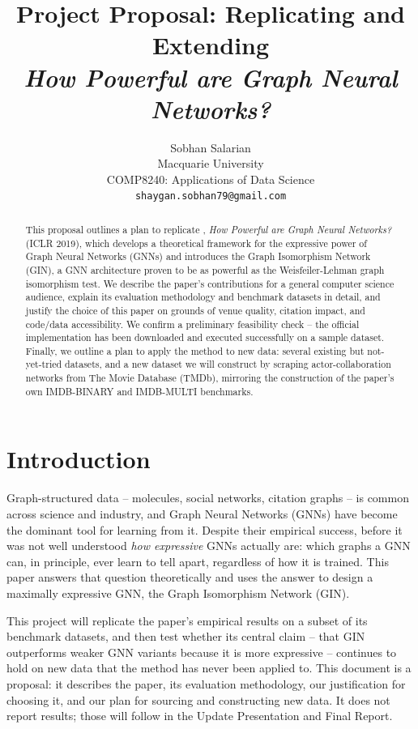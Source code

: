 \documentclass[11pt]{article}
\title{Project Proposal: Replicating and Extending \\ \textit{How Powerful are Graph Neural Networks?}}
\author{
  Sobhan Salarian \\
  Macquarie University \\
  COMP8240: Applications of Data Science \\
  \texttt{shaygan.sobhan79@gmail.com}
}
\begin{document}
\raggedbottom
\maketitle

\begin{abstract}
This proposal outlines a plan to replicate \citet{xu2019gin}, \textit{How Powerful are Graph Neural Networks?} (ICLR 2019), which develops a theoretical framework for the expressive power of Graph Neural Networks (GNNs) and introduces the Graph Isomorphism Network (GIN), a GNN architecture proven to be as powerful as the Weisfeiler-Lehman graph isomorphism test. We describe the paper's contributions for a general computer science audience, explain its evaluation methodology and benchmark datasets in detail, and justify the choice of this paper on grounds of venue quality, citation impact, and code/data accessibility. We confirm a preliminary feasibility check -- the official implementation has been downloaded and executed successfully on a sample dataset. Finally, we outline a plan to apply the method to new data: several existing but not-yet-tried datasets, and a new dataset we will construct by scraping actor-collaboration networks from The Movie Database (TMDb), mirroring the construction of the paper's own IMDB-BINARY and IMDB-MULTI benchmarks.
\end{abstract}

\section{Introduction}
Graph-structured data -- molecules, social networks, citation graphs -- is common across science and industry, and Graph Neural Networks (GNNs) have become the dominant tool for learning from it. Despite their empirical success, before \citet{xu2019gin} it was not well understood \emph{how expressive} GNNs actually are: which graphs a GNN can, in principle, ever learn to tell apart, regardless of how it is trained. This paper answers that question theoretically and uses the answer to design a maximally expressive GNN, the Graph Isomorphism Network (GIN).

This project will replicate the paper's empirical results on a subset of its benchmark datasets, and then test whether its central claim -- that GIN outperforms weaker GNN variants because it is more expressive -- continues to hold on new data that the method has never been applied to. This document is a proposal: it describes the paper, its evaluation methodology, our justification for choosing it, and our plan for sourcing and constructing new data. It does not report results; those will follow in the Update Presentation and Final Report.
\end{document}
